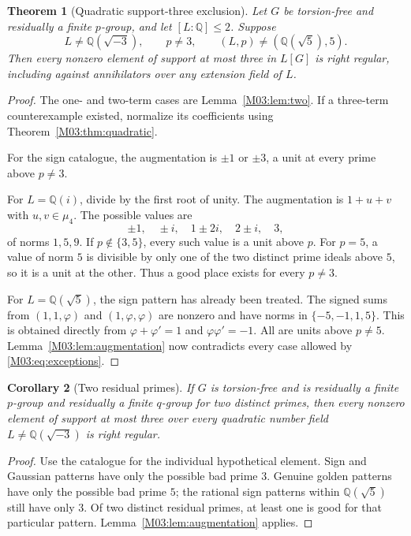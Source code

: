 \documentclass[11pt,a4paper,oneside]{report}
\newtheorem{theorem}{Theorem}[section]
\newtheorem{corollary}[theorem]{Corollary}
\theoremstyle{definition}
\theoremstyle{remark}
\newcommand{\Q}{\mathbb Q}
\newcommand{\ph}{\varphi}
\begin{document}
\begin{theorem}[Quadratic support-three exclusion]\label{M03:thm:residualp}
Let \(G\) be torsion-free and residually a finite \(p\)-group, and let \([L:\Q]\le2\). Suppose
\begin{equation}\label{M03:eq:exceptions}
L\ne\Q(\sqrt{-3}),\qquad p\ne3,\qquad
(L,p)\ne(\Q(\sqrt5),5).
\end{equation}
Then every nonzero element of support at most three in \(L[G]\) is right regular, including against annihilators over any extension field of \(L\).
\end{theorem}
\begin{proof}
The one- and two-term cases are Lemma~\ref{M03:lem:two}. If a three-term counterexample existed, normalize its coefficients using Theorem~\ref{M03:thm:quadratic}.

For the sign catalogue, the augmentation is \(\pm1\) or \(\pm3\), a unit at every prime above \(p\ne3\).

For \(L=\Q(i)\), divide by the first root of unity. The augmentation is \(1+u+v\) with \(u,v\in\mu_4\). The possible values are
\[
\pm1,\quad\pm i,\quad1\pm2i,\quad2\pm i,\quad3,
\]
of norms \(1,5,9\). If \(p\notin\{3,5\}\), every such value is a unit above \(p\). For \(p=5\), a value of norm \(5\) is divisible by only one of the two distinct prime ideals above \(5\), so it is a unit at the other. Thus a good place exists for every \(p\ne3\).

For \(L=\Q(\sqrt5)\), the sign pattern has already been treated. The signed sums from \((1,1,\ph)\) and \((1,\ph,\ph)\) are nonzero and have norms in \(\{-5,-1,1,5\}\). This is obtained directly from \(\ph+\ph'=1\) and \(\ph\ph'=-1\). All are units above \(p\ne5\). Lemma~\ref{M03:lem:augmentation} now contradicts every case allowed by \eqref{M03:eq:exceptions}.
\end{proof}

\begin{corollary}[Two residual primes]\label{M03:cor:twoprimes}
If \(G\) is torsion-free and is residually a finite \(p\)-group and residually a finite \(q\)-group for two distinct primes, then every nonzero element of support at most three over every quadratic number field \(L\ne\Q(\sqrt{-3})\) is right regular.
\end{corollary}
\begin{proof}
Use the catalogue for the individual hypothetical element. Sign and Gaussian patterns have only the possible bad prime \(3\). Genuine golden patterns have only the possible bad prime \(5\); the rational sign patterns within \(\Q(\sqrt5)\) still have only \(3\). Of two distinct residual primes, at least one is good for that particular pattern. Lemma~\ref{M03:lem:augmentation} applies.
\end{proof}
\end{document}
